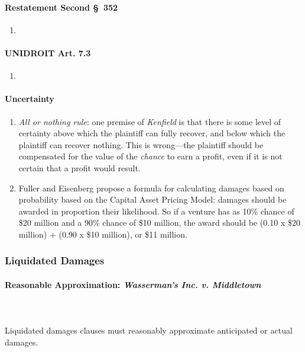 \paragraph{Restatement Second \S\ 352}

\begin{enumerate}
    \item %
\end{enumerate}

\paragraph{UNIDROIT Art. 7.3}

\begin{enumerate}
    \item %
\end{enumerate}

\paragraph{Uncertainty}

\begin{enumerate}
    \item \emph{All or nothing rule}: one premise of \emph{Kenfield} is that 
    there is some level of certainty above which the plaintiff can fully 
    recover, and below which the plaintiff can recover nothing. This is 
    wrong---the plaintiff should be compensated for the value of the 
    \emph{chance} to earn a profit, even if it is not certain that a profit 
    would result.
    \item Fuller and Eisenberg propose a formula for calculating damages based 
    on probability based on the Capital Asset Pricing Model: damages should be 
    awarded in proportion their likelihood.  So if a venture has as 10\% 
    chance of \$20 million and a 90\% chance of \$10 million, the award should 
    be (0.10 x \$20 million) + (0.90 x \$10 million), or \$11 million.
\end{enumerate}

\subsubsection{Liquidated Damages}

\paragraph{Reasonable Approximation: \emph{Wasserman's Inc. v. Middletown}}
~\\\\
Liquidated damages clauses must reasonably approximate anticipated or actual 
damages.

